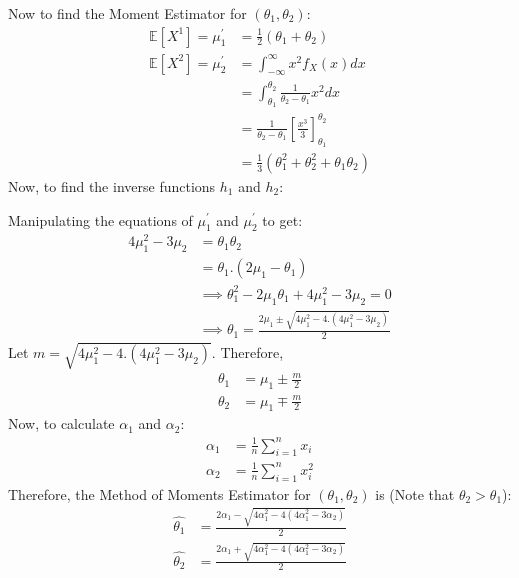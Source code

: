 \documentclass[a4paper]{article}
\begin{document}
Now to find the Moment Estimator for $\left( \theta_1,\theta_2 \right) $:
\begin{equation*}
	\begin{split}
	\mathbb{E}\left[ X^{1} \right] =  \mu_1^{\prime} &= \frac{1}{2} \left( \theta_1+\theta_2 \right) \\
	\mathbb{E}\left[ X^{2} \right] = \mu_2^{\prime} &= \int_{-\infty}^{\infty} x^{2} f_X\left( x \right)  dx\\
	&= \int_{\theta_1}^{\theta_2} \frac{1}{\theta_2-\theta_1} x^2dx\\
	&= \frac{1}{\theta_2-\theta_1} \left[ \frac{x^3}{3} \right]_{\theta_1}^{\theta_2}\\
	&= \frac{1}{3} \left( \theta_1^2 + \theta_2^2 + \theta_1\theta_2 \right) 
	\end{split}
\end{equation*}
Now, to find the inverse functions $h_1 $ and $h_2$:

Manipulating the equations of $\mu_1^{\prime}$ and $\mu_2^{\prime}$ to get:
\begin{equation*}
	\begin{split}
		4\mu_1^{2} - 3\mu_2 &= \theta_1\theta_2\\
		&= \theta_1.\left( 2\mu_1 - \theta_1 \right)\\
		&\implies \theta_1^2 - 2\mu_1\theta_1 + 4\mu_1^2 - 3\mu_2 = 0\\
		&\implies \theta_1 = \frac{2\mu_1 \pm \sqrt{4\mu_1^2 - 4.\left( 4\mu_1^2 - 3\mu_2 \right) } }{2}
	\end{split}
\end{equation*}
Let $m = \sqrt{4\mu_1^2 - 4.\left( 4\mu_1^2 - 3\mu_2 \right)}$.
\newline\newline
Therefore,
\begin{equation*}
	\begin{split}
		\theta_1 &= \mu_1 \pm \frac{m}{2}\\
		\theta_2 &= \mu_1 \mp \frac{m}{2}
	\end{split}
\end{equation*}
Now, to calculate $\alpha_1$ and $\alpha_2$:
\begin{equation*}
	\begin{split}
		\alpha_1 &= \frac{1}{n}\sum_{i=1}^{n} x_i\\
		\alpha_2 &=  \frac{1}{n}\sum_{i=1}^{n} x_i^2
	\end{split}
\end{equation*}
Therefore, the Method of Moments Estimator for $\left( \theta_1,\theta_2 \right)$ is (Note that $\theta_2 > \theta_1$):
\begin{equation*}
	\begin{split}
		\hat{\theta_1} &=  \frac{2\alpha_1 - \sqrt{4\alpha_1^2 - 4\left( 4\alpha_1^2 - 3\alpha_2 \right) } }{2}\\
		\hat{\theta_2} &=  \frac{2\alpha_1 + \sqrt{4\alpha_1^2 - 4\left( 4\alpha_1^2 - 3\alpha_2 \right) } }{2}
	\end{split}
\end{equation*}
\end{document}
